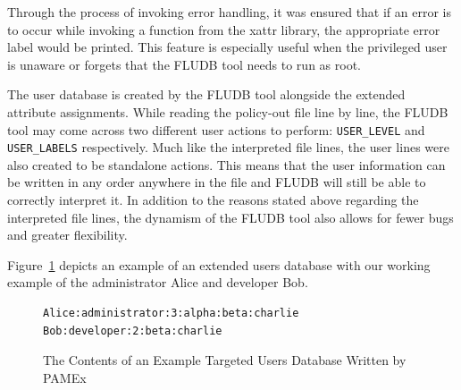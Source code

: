 Through the process of invoking error handling, it was ensured that if an error is to occur while invoking a 
function from the xattr library, the appropriate error label would be 
printed. This feature is especially useful when the privileged user is 
unaware or forgets that the FLUDB tool needs to run as root. 

The user database is created by the FLUDB tool alongside the 
extended attribute assignments. While reading the policy-out file line 
by line, the FLUDB tool may come across two different user actions to 
perform: \texttt{USER\_LEVEL} and \texttt{USER\_LABELS} respectively. Much like the 
interpreted file lines, the user lines were also created to be 
standalone actions. This means that the user information can be written 
in any order anywhere in the file and FLUDB will still be 
able to correctly interpret it. In addition to the reasons stated 
above regarding the interpreted file lines, the dynamism of the 
FLUDB tool also allows for fewer bugs and greater flexibility. 

Figure~\ref{usersdbex} depicts an example of an extended users database with our 
working example of the administrator Alice and developer Bob.

\begin{figure}[htb]
    \centering
    \begin{tcolorbox}[width=.8\textwidth, boxsep=5pt, sharp corners, colback=white, colframe=black, fontupper=\footnotesize\ttfamily] %
        \begin{minipage}{\textwidth} %
            \begin{lstlisting}
Alice:administrator:3:alpha:beta:charlie 
Bob:developer:2:beta:charlie 
            \end{lstlisting}
        \end{minipage}
    \end{tcolorbox}
    \caption[Example of PAMEx Targeted Users Database Contents]{\label{usersdbex}The Contents of an Example Targeted Users Database Written by PAMEx}
\end{figure}

\vspace{\baselineskip}


